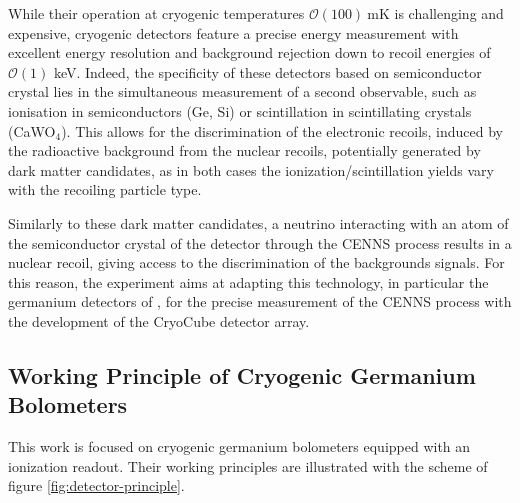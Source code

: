 While their operation at cryogenic temperatures $\mathcal{O}(100)\ \si{\milli\kelvin}$ is challenging and expensive, cryogenic detectors feature a precise energy measurement with excellent energy resolution and background rejection down to recoil energies of $\mathcal{O}(1)$ \si{\kilo\eV}.
Indeed, the specificity of these detectors based on semiconductor crystal lies in the simultaneous measurement of a second observable, such as ionisation in semiconductors (Ge, Si) or scintillation in scintillating crystals (CaWO$_4$). This allows for the discrimination of the electronic recoils, induced by the radioactive background from the nuclear recoils, potentially generated by dark matter candidates, as in both cases the ionization/scintillation yields vary with the recoiling particle type.

Similarly to these dark matter candidates, a neutrino interacting with an atom of the semiconductor crystal of the detector through the CENNS process results in a nuclear recoil, giving access to the discrimination of the backgrounds signals.
For this reason, the \Ricochet{} experiment aims at adapting this technology, in particular the germanium detectors of \Edelweiss{}, for the precise measurement of the CENNS process with the development of the CryoCube detector array.


\subsection{Working Principle of Cryogenic Germanium Bolometers}
\label{par:detector-principle}
\label{double-energy-measurement}

This work is focused on cryogenic germanium bolometers equipped with an ionization readout. Their working principles are illustrated with the scheme of figure \ref{fig:detector-principle}.

